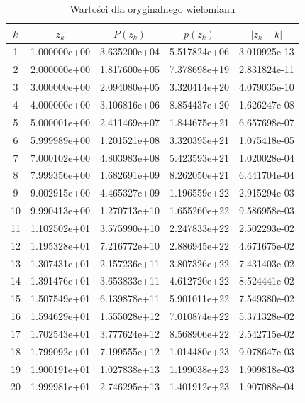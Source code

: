 \documentclass[12pt]{article}
\begin{document}
\begin{table}[!h]
\centering
\footnotesize
    \label{tab:table4}
    \begin{tabular}{|c|c|c|c|c|}
    		\hline
    		$k$ & $z_k$ & $P(z_k)$ & $p(z_k)$ & $|z_k - k|$\\
    		\hline
1 & 1.000000e+00 & 3.635200e+04 & 5.517824e+06 & 3.010925e-13\\
\hline
2 & 2.000000e+00 & 1.817600e+05 & 7.378698e+19 & 2.831824e-11\\
\hline
3 & 3.000000e+00 & 2.094080e+05 & 3.320414e+20 & 4.079035e-10\\
\hline
4 & 4.000000e+00 & 3.106816e+06 & 8.854437e+20 & 1.626247e-08\\
\hline
5 & 5.000001e+00 & 2.411469e+07 & 1.844675e+21 & 6.657698e-07\\
\hline
6 & 5.999989e+00 & 1.201521e+08 & 3.320395e+21 & 1.075418e-05\\
\hline
7 & 7.000102e+00 & 4.803983e+08 & 5.423593e+21 & 1.020028e-04\\
\hline
8 & 7.999356e+00 & 1.682691e+09 & 8.262050e+21 & 6.441704e-04\\
\hline
9 & 9.002915e+00 & 4.465327e+09 & 1.196559e+22 & 2.915294e-03\\
\hline
10 & 9.990413e+00 & 1.270713e+10 & 1.655260e+22 & 9.586958e-03\\
\hline
11 & 1.102502e+01 & 3.575990e+10 & 2.247833e+22 & 2.502293e-02\\
\hline
12 & 1.195328e+01 & 7.216772e+10 & 2.886945e+22 & 4.671675e-02\\
\hline
13 & 1.307431e+01 & 2.157236e+11 & 3.807326e+22 & 7.431403e-02\\
\hline
14 & 1.391476e+01 & 3.653833e+11 & 4.612720e+22 & 8.524441e-02\\
\hline
15 & 1.507549e+01 & 6.139878e+11 & 5.901011e+22 & 7.549380e-02\\
\hline
16 & 1.594629e+01 & 1.555028e+12 & 7.010874e+22 & 5.371328e-02\\
\hline
17 & 1.702543e+01 & 3.777624e+12 & 8.568906e+22 & 2.542715e-02\\
\hline
18 & 1.799092e+01 & 7.199555e+12 & 1.014480e+23 & 9.078647e-03\\
\hline
19 & 1.900191e+01 & 1.027838e+13 & 1.199038e+23 & 1.909818e-03\\
\hline
20 & 1.999981e+01 & 2.746295e+13 & 1.401912e+23 & 1.907088e-04\\
\hline
    \end{tabular}
    \caption{Wartości dla oryginalnego wielomianu}
\end{table}
\end{document}
